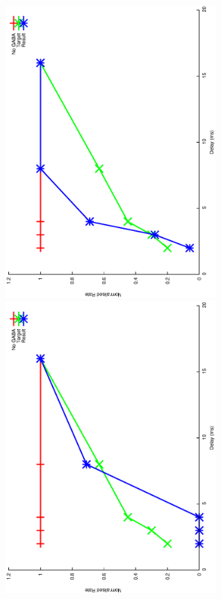 \documentclass{article}
\begin{document}
\includegraphics[keepaspectratio=true,angle=-90,width=0.6\textwidth]{DS_ClickRecovery_result.4.eps}\clearpage
\includegraphics[keepaspectratio=true,angle=-90,width=0.6\textwidth]{DS_ClickRecovery_result.5.eps}\clearpage
\end{document}
